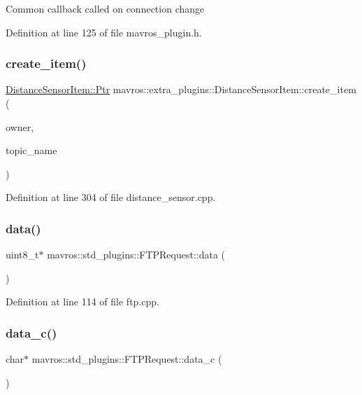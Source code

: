 Common callback called on connection change 

Definition at line 125 of file mavros\+\_\+plugin.\+h.

\mbox{\label{group__plugin_gae1634c431193fc47e5f577b9e326ea0b}} 
\subsubsection{\texorpdfstring{create\_item()}{create\_item()}}
{\footnotesize\ttfamily \mbox{\hyperlink{group__plugin_ga0156f4cebc73c6f4b88d5a4053e98c2b}{Distance\+Sensor\+Item\+::\+Ptr}} mavros\+::extra\+\_\+plugins\+::\+Distance\+Sensor\+Item\+::create\+\_\+item (\begin{DoxyParamCaption}\item[{\mbox{\hyperlink{classmavros_1_1extra__plugins_1_1DistanceSensorPlugin}{Distance\+Sensor\+Plugin}} $\ast$}]{owner,  }\item[{std\+::string}]{topic\+\_\+name }\end{DoxyParamCaption})\hspace{0.3cm}{\ttfamily [static]}}



Definition at line 304 of file distance\+\_\+sensor.\+cpp.

\mbox{\label{group__plugin_ga8624be9f0794a1e686a06f68fe405bcd}} 
\subsubsection{\texorpdfstring{data()}{data()}}
{\footnotesize\ttfamily uint8\+\_\+t$\ast$ mavros\+::std\+\_\+plugins\+::\+F\+T\+P\+Request\+::data (\begin{DoxyParamCaption}{ }\end{DoxyParamCaption})\hspace{0.3cm}{\ttfamily [inline]}}



Definition at line 114 of file ftp.\+cpp.

\mbox{\label{group__plugin_ga0786d26298e7a59ee7e22d9bc0c7f7b1}} 
\subsubsection{\texorpdfstring{data\_c()}{data\_c()}}
{\footnotesize\ttfamily char$\ast$ mavros\+::std\+\_\+plugins\+::\+F\+T\+P\+Request\+::data\+\_\+c (\begin{DoxyParamCaption}{ }\end{DoxyParamCaption})\hspace{0.3cm}{\ttfamily [inline]}}



